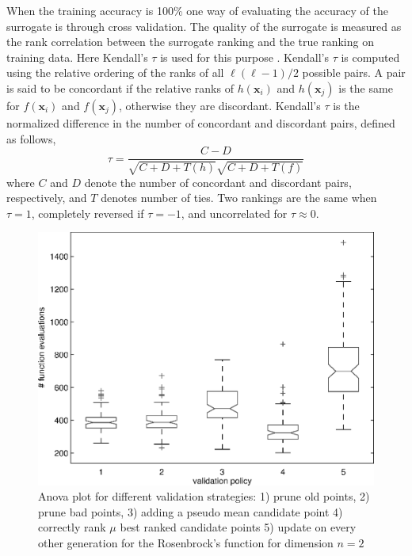 \documentclass[conference]{IEEEtran}
\renewcommand{\vec}[1]{{\mbox{\boldmath$#1$}}}
\renewcommand{\vec}[1]{{\mathbf #1}}
\begin{document}
When the training accuracy is 100\% one way of evaluating the accuracy of the surrogate is through cross validation. The quality of the surrogate is measured as the rank correlation between the surrogate ranking and the true ranking on training data. Here Kendall's $\tau$ is used for this purpose \cite{kendalltau}.  Kendall's $\tau$ is computed using the relative ordering of the ranks of all $\ell(\ell-1)/2$ possible pairs.  A pair is said to be concordant if the relative ranks of $h(\vec{x}_i)$ and $h(\vec{x}_j)$ is the same for $f(\vec{x}_i)$ and $f(\vec{x}_j)$, otherwise they are discordant. Kendall's $\tau$ is the normalized difference in the number of concordant and discordant pairs, defined as follows,
\begin{equation}
\tau = \frac{C-D}{\sqrt{C+D+T(h)}\sqrt{C+D+T(f)}}
\end{equation}
where $C$ and $D$ denote the number of concordant and discordant pairs, respectively, and $T$ denotes number of ties.
Two rankings are the same when $\tau=1$, completely reversed if $\tau = -1$, and uncorrelated for $\tau \approx 0$.

\begin{figure}[b!]
\centering
\includegraphics[width=0.95\columnwidth]{figs/anova.eps}
\caption{Anova plot for different validation strategies: 1) prune old points, 2) prune bad points, 3) adding a pseudo mean candidate point 
4) correctly rank $\mu$ best ranked candidate points 5) update on every other generation for the Rosenbrock's function for dimension $n=2$}
\label{fig:anova}
\end{figure}
\end{document}
